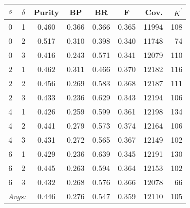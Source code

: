 \begin{table}[!ht]
{%
\small
\centering
\setlength{\extrarowheight}{3pt}
\begin{tabular}{cc|ccccrr}
$s$ & $\delta$ & Purity &  BP & BR & F & Cov. & $K^{\prime}$ \\ \hline\hline
0 & 1 & 0.460 & 0.366 & 0.366 & 0.365 & 11994 & 108 \\
0 & 2 & 0.517 & 0.310 & 0.398 & 0.340 & 11748 & 74 \\
0 & 3 & 0.416 & 0.243 & 0.571 & 0.341 & 12079 & 110 \\ \hline %
2 & 1 & 0.462 & 0.311 & 0.466 & 0.370 & 12182 & 116 \\
2 & 2 & 0.456 & 0.269 & 0.583 & 0.368 & 12187 & 111 \\%
2 & 3 & 0.433 & 0.236 & 0.629 & 0.343 & 12194 & 106 \\ \hline %
4 & 1 & 0.426 & 0.259 & 0.599 & 0.361 & 12198 & 134 \\  %
4 & 2 & 0.441 & 0.279 & 0.573 & 0.374 & 12164 & 106 \\
4 & 3 & 0.431 & 0.272 & 0.565 & 0.367 & 12149 & 102 \\ \hline %
6 & 1 & 0.429 & 0.236 & 0.639 & 0.345 & 12191 & 130 \\  %
6 & 2 & 0.445 & 0.263 & 0.594 & 0.364 & 12153 & 102 \\
6 & 3 & 0.432 & 0.268 & 0.576 & 0.366 & 12078 & 66 \\ \hline \hline %
 \multicolumn{2}{r|}{\textit{Avgs:}} & 0.446 & 0.276 & 0.547 & 0.359 & 12110 & 105 \\
\end{tabular}
}\\
%

\end{table}
